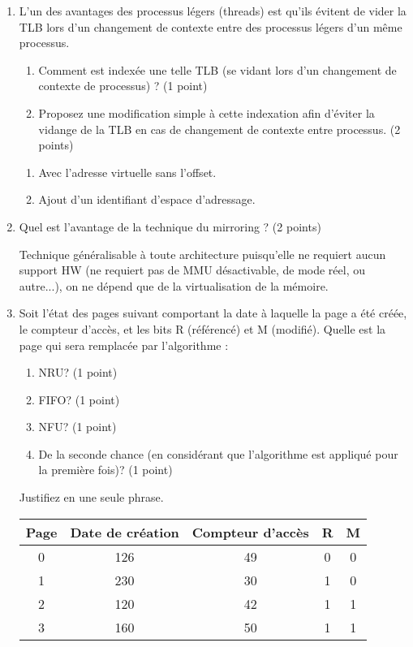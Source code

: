 \begin{enumerate}
\item L'un des avantages des processus légers (threads) est qu'ils évitent de vider la TLB lors d'un changement de contexte entre des processus légers d'un même processus.
\begin{enumerate}
  \item Comment est indexée une telle TLB (se vidant lors d'un changement de contexte de processus) ? (1 point)
  \item Proposez une modification simple à cette indexation afin d'éviter la vidange de la TLB en cas de changement de contexte entre processus. (2 points)
\end{enumerate}

\begin{correction}
\begin{enumerate}[label=(\alph*)]
\item Avec l'adresse virtuelle sans l'offset.
\item Ajout d'un identifiant d'espace d'adressage.
\end{enumerate}
\end{correction}

\item Quel est l'avantage de la technique du mirroring ? (2 points)

\begin{correction}
Technique généralisable à toute architecture puisqu'elle ne requiert aucun support HW (ne requiert pas de MMU désactivable, de mode réel, ou autre...), on ne dépend que de la virtualisation de la mémoire.
\end{correction}

\item Soit l'état des pages suivant comportant la date à laquelle la page a été créée, le compteur d'accès, et les bits R (référencé) et M (modifié). Quelle est la page qui sera remplacée par l'algorithme :
\begin{enumerate}
  \item NRU? (1 point)
  \item FIFO? (1 point)
  \item NFU? (1 point)
  \item De la seconde chance (en considérant que l'algorithme est appliqué pour la première fois)? (1 point)
\end{enumerate}
Justifiez en une seule phrase.

\begin{center}
\begin{tabular}{|c|c|c|c|c|}
\hline
Page & Date de création & Compteur d'accès & R & M\tabularnewline
\hline
\hline
0 & 126 & 49 & 0 & 0\tabularnewline
\hline
1 & 230 & 30 & 1 & 0\tabularnewline
\hline
2 & 120 & 42 & 1 & 1\tabularnewline
\hline
3 & 160 & 50 & 1 & 1\tabularnewline
\hline
\end{tabular}
\end{center}


\end{enumerate}
